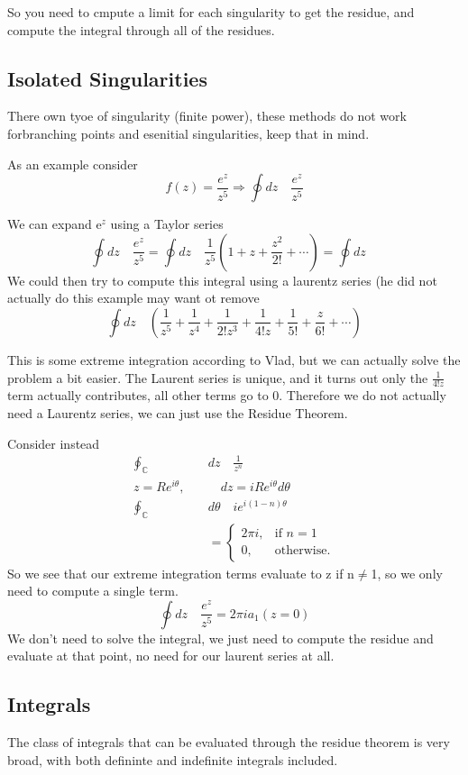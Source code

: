 \documentclass{article}
\newcommand{\be}{\begin{equation}}
\newcommand{\ee}{\end{equation}}
\begin{document}
So you need to cmpute a limit for each singularity to get the residue, and compute the integral through all of the residues. 

\subsection*{Isolated Singularities}
There own tyoe of singularity (finite power), these methods do not work forbranching points and esenitial  singularities, keep that in mind. 

As an example consider
\be
f(z) = \frac{e^z}{z^5} \Rightarrow \oint dz \quad \frac{e^z}{z^5}
\ee

We can expand e$^z$ using a Taylor series
\be
\oint dz \quad \frac{e^z}{z^5} = \oint dz \quad \frac{1}{z^5} \left(1+z+\frac{z^2}{2!} + \cdots\right) = \oint dz \quad 
\ee
We could then try to compute this integral using a laurentz series (he did not actually do this example may want ot remove
\be
\oint dz \quad \left(\frac{1}{z^5} + \frac{1}{z^4} + \frac{1}{2!z^3} + \frac{1}{4!z} + \frac{1}{5!} + \frac{z}{6!} + \cdots \right)
\ee

This is some extreme integration according to Vlad, but we can actually solve the problem a bit easier.
The Laurent series is unique, and it turns out only the $\frac{1}{4!z}$ term actually contributes, all other terms go to 0.
Therefore we do not actually need a Laurentz series, we can just use the Residue Theorem. 

Consider instead
\be
\begin{split}
    \oint_\mathbb{C} & dz \quad \frac{1}{z^n} \\
    z = Re^{i\theta}, \quad & \quad dz = iRe^{i\theta}d\theta \\
    \oint_\mathbb{C} & d\theta \quad ie^{i(1-n)\theta} \\
    &= \begin{cases}
   2\pi i, & \text{if $n=1$}\\
    0, & \text{otherwise}.
  \end{cases}
\end{split}
\ee
So we see that our extreme integration terms evaluate to z if n$\neq$1, so we only need to compute a single term. 
\be
\oint dz \quad \frac{e^z}{z^5} = 2\pi i a_1(z=0)
\ee
We don't need to solve the integral, we just need to compute the residue and evaluate at that point, no need for our laurent series at all. 

\subsection*{Integrals}
The class of integrals that can be evaluated through the residue theorem is very broad, with both defininte and indefinite integrals included.
\end{document}
